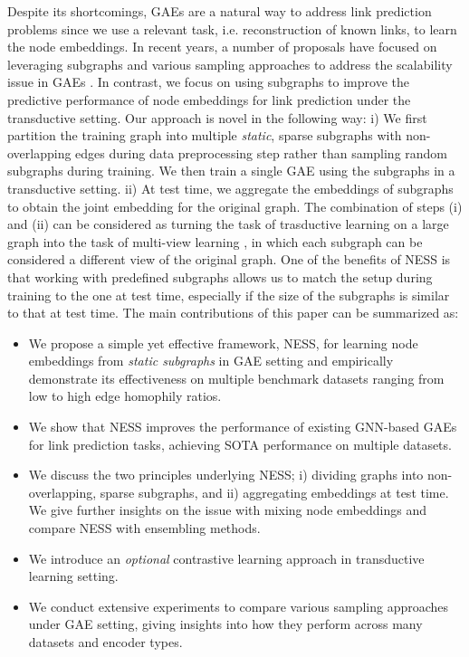 \documentclass{article}
\begin{document}
Despite its shortcomings, GAEs are a natural way to address link prediction problems since we use a relevant task, i.e. reconstruction of known links, to learn the node embeddings. In recent years, a number of proposals have focused on leveraging subgraphs and various sampling approaches to address the scalability issue in GAEs \citep{hamilton2017inductive, chiang2019cluster, zeng2019graphsaint, salha2021fastgae, chen2018fastgcn, chen2017stochastic}. In contrast, we focus on using subgraphs to improve the predictive performance of node embeddings for link prediction under the transductive setting. Our approach is novel in the following way: i) We first partition the training graph into multiple \textit{static}, sparse subgraphs with non-overlapping edges during data preprocessing step rather than sampling random subgraphs during training. We then train a single GAE using the subgraphs in a transductive setting. ii) At test time, we aggregate the embeddings of subgraphs to obtain the joint embedding for the original graph. The combination of steps (i) and (ii) can be considered as turning the task of trasductive learning on a large graph into the task of multi-view learning \citep{bachman2019learning}, in which each subgraph can be considered a different view of the original graph. One of the benefits of NESS is that working with predefined subgraphs allows us to match the setup during training to the one at test time, especially if the size of the subgraphs is similar to that at test time. The main contributions of this paper can be summarized as:



\begin{itemize}
    \item We propose a simple yet effective framework, NESS, for learning node embeddings from \textit{static subgraphs} in GAE setting and empirically demonstrate its effectiveness on multiple benchmark datasets ranging from low to high edge homophily ratios.
    \item We show that NESS improves the performance of existing GNN-based GAEs for link prediction tasks, achieving SOTA performance on multiple datasets.
    \item We discuss the two principles underlying NESS; i) dividing graphs into non-overlapping, sparse subgraphs, and ii) aggregating embeddings at test time. We give further insights on the issue with mixing node embeddings and compare NESS with ensembling methods. 
    \item We introduce an \textit{optional} contrastive learning approach in transductive learning setting.
    \item We conduct extensive experiments to compare various sampling approaches under GAE setting, giving insights into how they perform across many datasets and encoder types.
\end{itemize}
\end{document}

